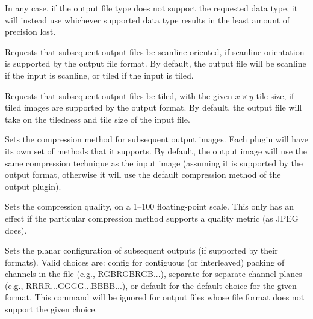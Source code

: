 In any case, if the output file type does not support the requested
data type, it will instead use whichever supported data type results
in the least amount of precision lost.
\apiend



Requests that subsequent output files be scanline-oriented, if scanline
orientation is supported by the output file format.  By default, the
output file will be scanline if the input is scanline, or tiled if the
input is tiled.
\apiend

Requests that subsequent output files be tiled, with the given $x \times y$ 
tile size, if tiled images are supported by the output format.
By default, the output file will take on the tiledness and tile size
of the input file.
\apiend

Sets the compression method for subsequent output images.  Each
\ImageOutput plugin will have its own set of methods that it supports.
By default, the output image will use the same compression technique as
the input image (assuming it is supported by the output format,
otherwise it will use the default compression method of the output
plugin).  
\apiend

Sets the compression quality, on a 1--100 floating-point scale.
This only has an effect if the particular compression method supports
a quality metric (as JPEG does).
\apiend

Sets the planar configuration of subsequent outputs (if supported by
their formats).  Valid choices are: {\cf config} for contiguous (or
interleaved) packing of channels in the file (e.g., RGBRGBRGB...), 
{\cf separate} for separate channel planes (e.g.,
RRRR...GGGG...BBBB...), or {\cf default} for the default choice for the
given format.  This command will be ignored for output files whose 
file format does not support the given choice.
\apiend

